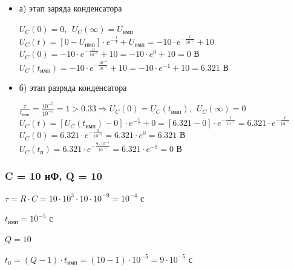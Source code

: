 \documentclass[a4paper,14pt]{extarticle}
\begin{document}
\begin{itemize}
\item[] а) этап заряда конденсатора

	$U_C(0) = 0,\ \ U_C(\infty) = U_\text{имп}$\\
	$U_C(t) = [0 - U_\text{имп}] \cdot e^{-\frac{t}{\tau}} + U_\text{имп} = -10 \cdot e^{-\frac{t}{10^{-5}}} + 10$\\
	$U_C(0) = -10 \cdot e^{-\frac{0}{10^{-5}}} + 10 = -10 \cdot e^0 + 10 = 0 \text{ В}$\\
	$U_C(t_\text{имп}) = -10 \cdot e^{-\frac{10^{-5}}{10^{-5}}} + 10 = -10 \cdot e^{-1} + 10 = 6.321 \text{ В}$

\item[] б) этап разряда конденсатора

	$\frac{\tau}{t_\text{имп}} = \frac{10^{-5}}{10^{-5}} = 1 > 0.33 \Rightarrow U_C(0) = U_C(t_\text{имп}),\ \ U_C(\infty) = 0$\\
	$U_C(t) = [U_C(t_\text{имп}) - 0] \cdot e^{-\frac{t}{\tau}} + 0 =  [6.321 - 0] \cdot e^{-\frac{t}{10^{-5}}} = 6.321 \cdot e^{-\frac{t}{10^{-5}}}$\\
	$U_C(0) = 6.321 \cdot e^{-\frac{0}{10^{-5}}} = 6.321 \cdot e^0 = 6.321 \text{ В}$\\
	$U_C(t_\text{п}) = 6.321 \cdot e^{-\frac{9 \cdot 10^{-5}}{10^{-5}}} = 6.321 \cdot e^{-9} = 0 \text{ В}$
\end{itemize}

\subsubsection{C = 10 нФ, Q = 10}

$\tau = R \cdot C = 10 \cdot 10^3 \cdot 10 \cdot 10^{-9} = 10^{-4} \text{ с}$

$t_\text{имп} = 10^{-5} \text{ с}$

$Q = 10$		

$t_\text{п} = (Q - 1) \cdot t_\text{имп} = (10 - 1) \cdot 10^{-5} = 9 \cdot 10^{-5} \text{ с}$
\end{document}
